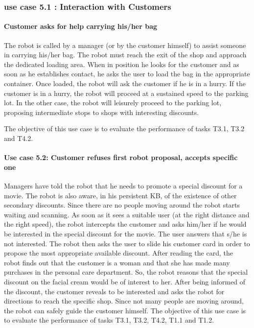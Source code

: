 \subsubsection {use case 5.1 : Interaction with Customers}
\paragraph*{Customer asks for help carrying his/her bag}
The robot is called by a manager (or by the customer himself) to assist
someone in carrying his/her bag. The robot must reach
the exit of the shop and approach the dedicated loading area. When
in position he looks for the customer and as soon as he establishes
contact, he asks the user to load the bag in the appropriate container.
Once loaded, the robot will ask the customer if he is in a hurry.
If the customer is in a hurry, the robot will proceed at a sustained
speed to the parking lot. In the other case, the robot will leisurely
proceed to the parking lot, proposing intermediate stops to shops
with interesting discounts.

The objective of this use case is to evaluate the performance of tasks T3.1, T3.2 and T4.2.
 
\paragraph*{Use case 5.2: Customer refuses first robot proposal, accepts specific one} Managers have told the robot that he needs to promote a special discount
for a movie. The robot is also aware, in his persistent KB, of the
existence of other secondary discounts. Since there are no people
moving around the robot starts waiting and scanning. As soon as it
sees a suitable user (at the right distance and the right speed),
the robot intercepts the customer and asks him/her if he would be interested
in the special discount for the movie. The user answers that s/he is not interested.
The robot then asks the user to slide his customer card in order to
propose the most appropriate available discount. After reading the
card, the robot finds out that the customer is a woman and that she
has made many purchases in the personal care department. 
So, the robot reasons that the special discount on the facial cream would be of interest
to her. After being informed of the discount, the customer reveals
to be interested and asks the robot for directions to reach the specific
shop. Since not many people are moving around, the robot can safely
guide the customer himself.
The objective of this use case is to evaluate the performance of tasks T3.1, T3.2, T4.2, T1.1 and T1.2.


